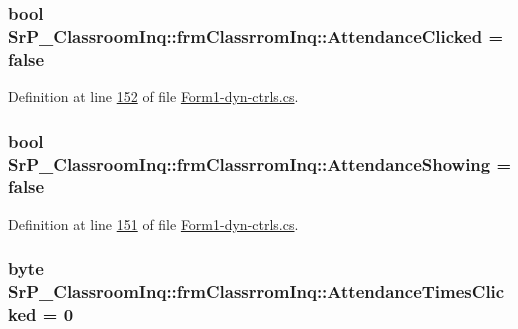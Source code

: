 \hypertarget{class_sr_p___classroom_inq_1_1frm_classrrom_inq_a319172bf9b9e58ec37499658a5289284}{
\subsubsection[{\-Attendance\-Clicked}]{\setlength{\rightskip}{0pt plus 5cm}bool {\bf \-Sr\-P\-\_\-\-Classroom\-Inq\-::frm\-Classrrom\-Inq\-::\-Attendance\-Clicked} = false}}
\label{class_sr_p___classroom_inq_1_1frm_classrrom_inq_a319172bf9b9e58ec37499658a5289284}


\-Definition at line \hyperlink{_form1-dyn-ctrls_8cs_source_l00152}{152} of file \hyperlink{_form1-dyn-ctrls_8cs_source}{\-Form1-\/dyn-\/ctrls.\-cs}.

\hypertarget{class_sr_p___classroom_inq_1_1frm_classrrom_inq_a24415681575df1fd435d1b1da60dfde3}{
\subsubsection[{\-Attendance\-Showing}]{\setlength{\rightskip}{0pt plus 5cm}bool {\bf \-Sr\-P\-\_\-\-Classroom\-Inq\-::frm\-Classrrom\-Inq\-::\-Attendance\-Showing} = false}}
\label{class_sr_p___classroom_inq_1_1frm_classrrom_inq_a24415681575df1fd435d1b1da60dfde3}


\-Definition at line \hyperlink{_form1-dyn-ctrls_8cs_source_l00151}{151} of file \hyperlink{_form1-dyn-ctrls_8cs_source}{\-Form1-\/dyn-\/ctrls.\-cs}.

\hypertarget{class_sr_p___classroom_inq_1_1frm_classrrom_inq_ade18c1a241b76944c2731681e1767652}{
\subsubsection[{\-Attendance\-Times\-Clicked}]{\setlength{\rightskip}{0pt plus 5cm}byte {\bf \-Sr\-P\-\_\-\-Classroom\-Inq\-::frm\-Classrrom\-Inq\-::\-Attendance\-Times\-Clicked} = 0}}
\label{class_sr_p___classroom_inq_1_1frm_classrrom_inq_ade18c1a241b76944c2731681e1767652}



